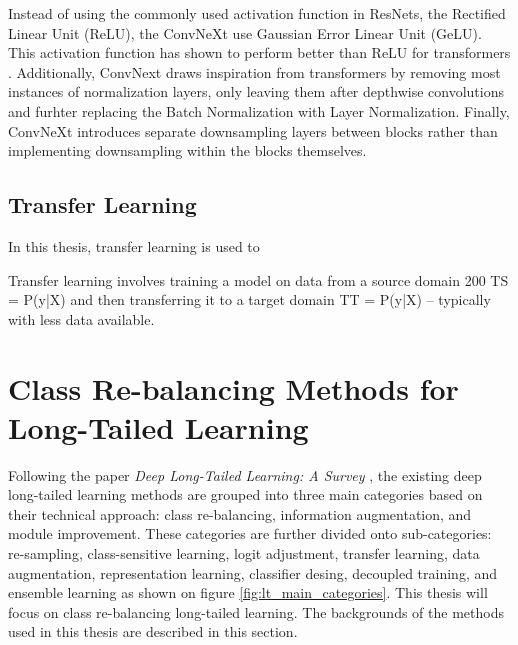 Instead of using the commonly used activation function in ResNets, the Rectified Linear Unit (ReLU), the ConvNeXt use Gaussian Error Linear Unit (GeLU). This activation function has shown to perform better than ReLU for transformers \cite{liu2022convnet2020s}. Additionally, ConvNext draws inspiration from transformers by removing most instances of normalization layers, only leaving them after depthwise convolutions and furhter replacing the Batch Normalization with Layer Normalization. Finally, ConvNeXt introduces separate downsampling layers between blocks rather than implementing downsampling within the blocks themselves. 



\subsection{Transfer Learning}
In this thesis, transfer learning is used to 

Transfer learning involves training a model on data from a source domain 200 TS = P(y|X) and then transferring it to a target domain TT = P(y|X) – typically with less data available. 


\section{Class Re-balancing Methods for Long-Tailed Learning}
\label{sec:lt_methods}

Following the paper \textit{Deep Long-Tailed Learning: A Survey} \cite{zhang2023deep}, the existing deep long-tailed learning methods are grouped into three main categories based on their technical approach: class re-balancing, information augmentation, and module improvement. These categories are further divided onto sub-categories: re-sampling, class-sensitive learning, logit adjustment, transfer learning, data augmentation, representation learning, classifier desing, decoupled training, and ensemble learning as shown on figure \ref{fig:lt_main_categories}. This thesis will focus on class re-balancing long-tailed learning. The backgrounds of the methods used in this thesis are described in this section.



